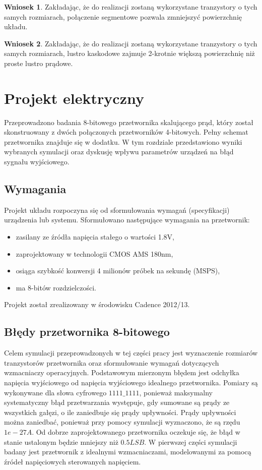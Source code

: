 \documentclass[10pt,a4paper,twoside]{report}
\theoremstyle{definition}
\theoremstyle{definition}
\theoremstyle{definition}
\theoremstyle{definition}
\theoremstyle{definition}
\newtheorem{wniosek}{Wniosek}[section]
\begin{document}
{{	\begin{wniosek}{Zakładając, że do realizacji zostaną wykorzystane tranzystory o tych samych rozmiarach, połączenie segmentowe pozwala zmniejszyć powierzchnię układu.}
	\end{wniosek}

	\begin{wniosek}{Zakładając, że do realizacji zostaną wykorzystane tranzystory o tych samych rozmiarach, lustro kaskodowe zajmuje 2-krotnie większą powierzchnię niż proste lustro prądowe.}
	\end{wniosek}

	\chapter{Projekt elektryczny}
	{	Przeprowadzono badania 8-bitowego przetwornika skalującego prąd, który został skonstruowany z dwóch połączonych przetworników 4-bitowych. Pełny schemat przetwornika znajduje się w dodatku. W tym rozdziale przedstawiono wyniki wybranych symulacji oraz dyskusję wpływu parametrów urządzeń na błąd sygnału wyjściowego.}
	
	\section{Wymagania}
	{	Projekt układu rozpoczyna się od sformułowania wymagań (specyfikacji) urządzenia lub systemu. Sformułowano następujące wymagania na przetwornik:
		\begin{itemize}
			\item zasilany ze źródła napięcia stałego o wartości 1.8V,
			\item zaprojektowany w technologii CMOS AMS 180nm,
			\item osiąga szybkość konwersji 4 milionów próbek na sekundę (MSPS),
			\item ma 8-bitów rozdzielczości.
		\end{itemize} 
	Projekt został zrealizowany w środowisku Cadence 2012/13.}
	
	\section{Błędy przetwornika 8-bitowego}
	{ Celem symulacji przeprowadzonych w tej części pracy jest wyznaczenie rozmiarów tranzystorów przetwornika oraz sformułowanie wymagań dotyczących wzmacniaczy operacyjnych. Podstawowym mierzonym błędem jest odchyłka napięcia wyjściowego od napięcia wyjściowego idealnego przetwornika. Pomiary są wykonywane dla słowa cyfrowego $1111\_1111$, ponieważ maksymalny systematyczny błąd przetwarzania występuje, gdy sumowane są prądy ze wszystkich gałęzi, o ile zaniedbuje się prądy upływności. Prądy upływności można zaniedbać, ponieważ przy pomocy symulacji wyznaczono, że są rzędu $1e-27A$. Od dobrze zaprojektowanego przetwornika oczekuje się, że błąd w stanie ustalonym będzie mniejszy niż $0.5LSB$. W pierwszej części symulacji badany jest przetwornik z idealnymi wzmacniaczami, modelowanymi za pomocą źródeł napięciowych sterowanych napięciem.}
	
}}
\end{document}
